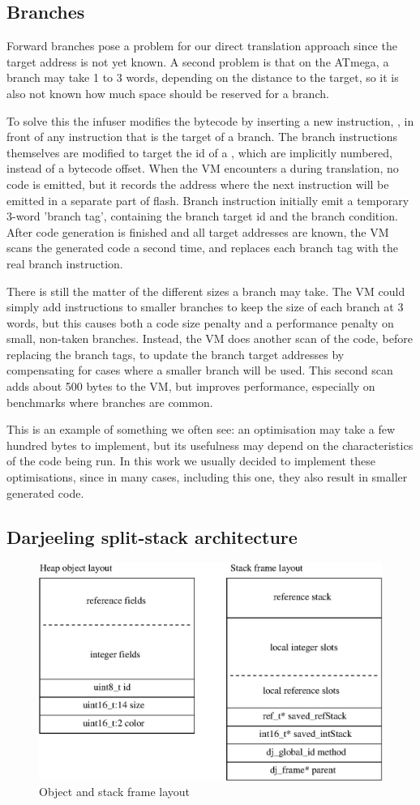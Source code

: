 \subsection{Branches}
Forward branches pose a problem for our direct translation approach since the target address is not yet known. A second problem is that on the ATmega, a branch may take 1 to 3 words, depending on the distance to the target, so it is also not known how much space should be reserved for a branch.

To solve this the infuser modifies the bytecode by inserting a new instruction, , in front of any instruction that is the target of a branch. The branch instructions themselves are modified to target the id of a , which are implicitly numbered, instead of a bytecode offset. When the VM encounters a  during translation, no code is emitted, but it records the address where the next instruction will be emitted in a separate part of flash. Branch instruction initially emit a temporary 3-word 'branch tag', containing the branch target id and the branch condition. After code generation is finished and all target addresses are known, the VM scans the generated code a second time, and replaces each branch tag with the real branch instruction.

There is still the matter of the different sizes a branch may take. The VM could simply add  instructions to smaller branches to keep the size of each branch at 3 words, but this causes both a code size penalty and a performance penalty on small, non-taken branches. Instead, the VM does another scan of the code, before replacing the branch tags, to update the branch target addresses by compensating for cases where a smaller branch will be used. This second scan adds about 500 bytes to the VM, but improves performance, especially on benchmarks where branches are common.

This is an example of something we often see: an optimisation may take a few hundred bytes to implement, but its usefulness may depend on the characteristics of the code being run. In this work we usually decided to implement these optimisations, since in many cases, including this one, they also result in smaller generated code.

\subsection{Darjeeling split-stack architecture}
\label{sec-darjeeling-split-architecure}
\begin{figure}[]
  \centering
  \includegraphics[width=0.5\linewidth]{object-and-stack-frame-layout.eps}
  \caption{Object and stack frame layout}
  \label{fig-object-and-stack-frame-layout}
\end{figure}

